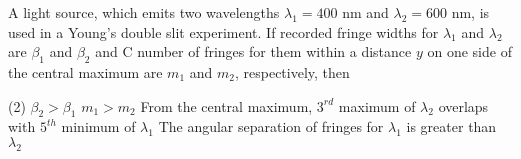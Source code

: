 
\item A light source, which emits two wavelengths \( \lambda_1 = 400 \text{ nm} \) and \( \lambda_2 = 600 \text{ nm} \), is used in a Young’s double slit experiment. If recorded fringe widths for \( \lambda_1 \) and \( \lambda_2 \) are \( \beta_1 \) and \( \beta_2 \) and \( \text{C} \) number of fringes for them within a distance \( y \) on one side of the central maximum are \( m_1 \) and \( m_2 \), respectively, then
    \begin{tasks}(2)
        \task \( \beta_2 > \beta_1 \)
        \task \( m_1 > m_2 \)
        \task From the central maximum, \( 3^{rd} \) maximum of \( \lambda_2 \) overlaps with \( 5^{th} \) minimum of \( \lambda_1 \)
        \task The angular separation of fringes for \( \lambda_1 \) is greater than \( \lambda_2 \)
    \end{tasks}
